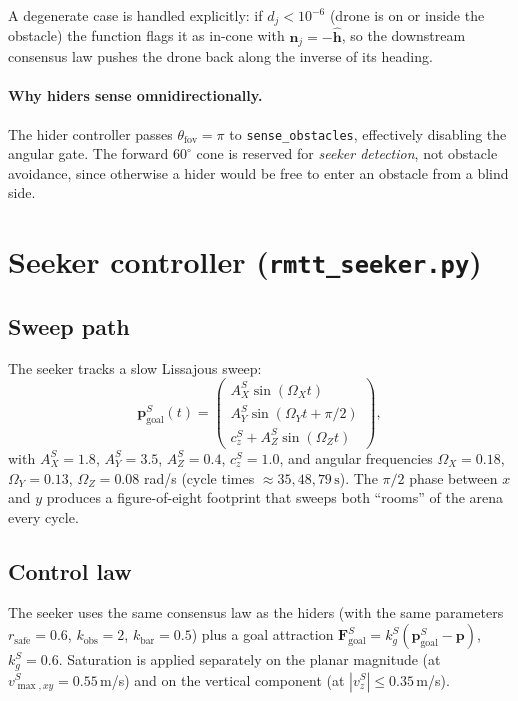 \documentclass[11pt,a4paper]{article}
\newcommand{\code}[1]{\texttt{#1}}
\newcommand{\vect}[1]{\mathbf{#1}}
\begin{document}
A degenerate case is handled explicitly: if $d_j < 10^{-6}$ (drone is on or
inside the obstacle) the function flags it as in-cone with $\vect{n}_j =
-\hat{\vect{h}}$, so the downstream consensus law pushes the drone back along
the inverse of its heading.

\paragraph{Why hiders sense omnidirectionally.}
The hider controller passes $\theta_\mathrm{fov} = \pi$ to
\code{sense\_obstacles}, effectively disabling the angular gate. The forward
$60^\circ$ cone is reserved for \emph{seeker detection}, not obstacle
avoidance, since otherwise a hider would be free to enter an obstacle from a
blind side.

\section{Seeker controller (\code{rmtt\_seeker.py})}

\subsection{Sweep path}
The seeker tracks a slow Lissajous sweep:
\[
    \vect{p}_\mathrm{goal}^{S}(t) = \begin{pmatrix}
        A_X^S \sin(\Omega_X t) \\
        A_Y^S \sin(\Omega_Y t + \pi/2) \\
        c_z^S + A_Z^S \sin(\Omega_Z t)
    \end{pmatrix},
\]
with $A_X^S = 1.8$, $A_Y^S = 3.5$, $A_Z^S = 0.4$, $c_z^S = 1.0$, and angular
frequencies $\Omega_X = 0.18$, $\Omega_Y = 0.13$, $\Omega_Z = 0.08$ rad/s
(cycle times $\approx 35, 48, 79\,\text{s}$). The $\pi/2$ phase between $x$
and $y$ produces a figure-of-eight footprint that sweeps both ``rooms'' of
the arena every cycle.

\subsection{Control law}
The seeker uses the same consensus law as the hiders (with the same
parameters $r_\mathrm{safe} = 0.6$, $k_\mathrm{obs} = 2$, $k_\mathrm{bar} =
0.5$) plus a goal attraction $\vect{F}_\mathrm{goal}^S = k_g^S (\vect{p}_\mathrm{goal}^S -
\vect{p})$, $k_g^S = 0.6$. Saturation is applied separately on the planar
magnitude (at $v_{\max,xy}^S = 0.55$\,m/s) and on the vertical component (at
$|v_z^S| \le 0.35$\,m/s).
\end{document}
